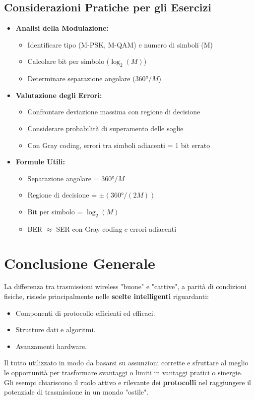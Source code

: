\subsection{Considerazioni Pratiche per gli Esercizi}
\begin{itemize}
    \item \textbf{Analisi della Modulazione:}
    \begin{itemize}
        \item Identificare tipo (M-PSK, M-QAM) e numero di simboli (M)
        \item Calcolare bit per simbolo ($\log_2(M)$)
        \item Determinare separazione angolare ($360°/M$)
    \end{itemize}
    \item \textbf{Valutazione degli Errori:}
    \begin{itemize}
        \item Confrontare deviazione massima con regione di decisione
        \item Considerare probabilità di superamento delle soglie
        \item Con Gray coding, errori tra simboli adiacenti = 1 bit errato
    \end{itemize}
    \item \textbf{Formule Utili:}
    \begin{itemize}
        \item Separazione angolare = $360°/M$
        \item Regione di decisione = $\pm(360°/(2M))$
        \item Bit per simbolo = $\log_2(M)$
        \item BER $\approx$ SER con Gray coding e errori adiacenti
    \end{itemize}
\end{itemize}

\section{Conclusione Generale}
La differenza tra trasmissioni wireless "buone" e "cattive", a parità di condizioni fisiche, risiede principalmente nelle \textbf{scelte intelligenti} riguardanti:
\begin{itemize}
    \item Componenti di protocollo efficienti ed efficaci.
    \item Strutture dati e algoritmi.
    \item Avanzamenti hardware.
\end{itemize}
Il tutto utilizzato in modo da basarsi su assunzioni corrette e sfruttare al meglio le opportunità per trasformare svantaggi o limiti in vantaggi pratici o sinergie. Gli esempi chiariscono il ruolo attivo e rilevante dei \textbf{protocolli} nel raggiungere il potenziale di trasmissione in un mondo "ostile".

